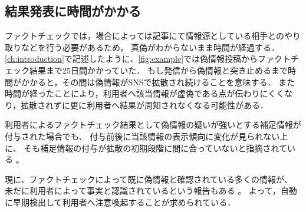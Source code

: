 \subsection{結果発表に時間がかかる}
ファクトチェックでは，場合によっては記事にて情報源としている相手とのやり取りなどを行う必要があるため，
真偽がわからないまま時間が経過する．
\cref{ch:introduction}で記述したように、\cref{fig:example}では偽情報投稿からファクトチェック結果まで25日間かかっていた．
もし発信から偽情報と突き止めるまで時間がかかると，その間は偽情報がSNSで拡散され続けることを意味する．
また時間が経ったことにより，利用者へ該当情報が虚偽である点が伝わりにくくなり，拡散されずに更に利用者へ結果が周知されなくなる可能性がある．

利用者によるファクトチェック結果として偽情報の疑いが強いとする補足情報が付与された場合でも、
付与前後に当該情報の表示傾向に変化が見られない上に、
そも補足情報の付与が拡散の初期段階に間に合っていないと指摘されている \cite{chuai2023rollout}。

現に、ファクトチェックによって既に偽情報と確認されている多くの情報が、
未だに利用者によって事実と認識されているという報告もある \cite{真一_2023}。
よって，自動に早期検出して利用者へ注意喚起することが求められている．
